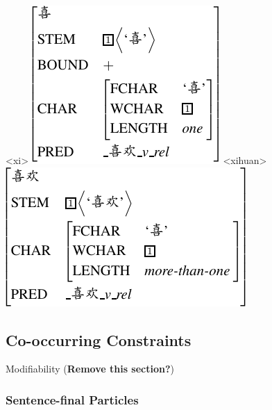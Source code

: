 \documentclass[11pt]{article}
\begin{document}
{\small 
{}
\a<xi>
\vspace{-10pt}
\newline
\includegraphics[scale=.8]{pdf/xi.pdf}
\a<xihuan>
\vspace{-10pt}
\newline
\includegraphics[scale=.8]{pdf/xihuan.pdf}
\xe}
\vspace{-20pt}




\subsection{Co-occurring Constraints}
\label{ssec:cooccurring}





Modifiability (\textbf{Remove this section?})


\subsubsection{Sentence-final Particles}
\label{sssec:sfp}
\end{document}
